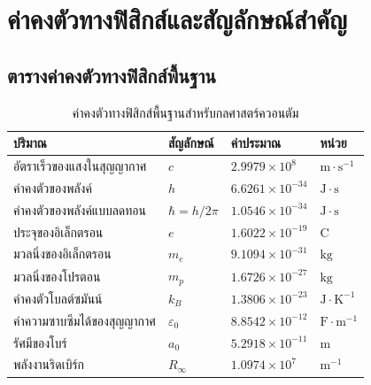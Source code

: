 \chapter{ค่าคงตัวทางฟิสิกส์และสัญลักษณ์สำคัญ}
\label{app:constants}

\section*{ตารางค่าคงตัวทางฟิสิกส์พื้นฐาน}
\begin{table}[H]
\centering
\begin{tabularx}{\textwidth}{l l Y l}
\toprule
\textbf{ปริมาณ} & \textbf{สัญลักษณ์} & \textbf{ค่าประมาณ} & \textbf{หน่วย} \\
\midrule
อัตราเร็วของแสงในสุญญากาศ & $c$ & $2.9979 \times 10^8$ & $\mathrm{m\cdot s^{-1}}$ \\
ค่าคงตัวของพลังค์ & $h$ & $6.6261 \times 10^{-34}$ & $\mathrm{J\cdot s}$ \\
ค่าคงตัวของพลังค์แบบลดทอน & $\hbar = h/2\pi$ & $1.0546 \times 10^{-34}$ & $\mathrm{J\cdot s}$ \\
ประจุของอิเล็กตรอน & $e$ & $1.6022 \times 10^{-19}$ & $\mathrm{C}$ \\
มวลนิ่งของอิเล็กตรอน & $m_e$ & $9.1094 \times 10^{-31}$ & $\mathrm{kg}$ \\
มวลนิ่งของโปรตอน & $m_p$ & $1.6726 \times 10^{-27}$ & $\mathrm{kg}$ \\
ค่าคงตัวโบลต์ซมันน์ & $k_B$ & $1.3806 \times 10^{-23}$ & $\mathrm{J\cdot K^{-1}}$ \\
ค่าความซาบซึมได้ของสุญญากาศ & $\varepsilon_0$ & $8.8542 \times 10^{-12}$ & $\mathrm{F\cdot m^{-1}}$ \\
รัศมีของโบร์ & $a_0$ & $5.2918 \times 10^{-11}$ & $\mathrm{m}$ \\
พลังงานริดเบิร์ก & $R_\infty$ & $1.0974 \times 10^7$ & $\mathrm{m^{-1}}$ \\
\bottomrule
\end{tabularx}
\caption{ค่าคงตัวทางฟิสิกส์พื้นฐานสำหรับกลศาสตร์ควอนตัม}
\end{table}
